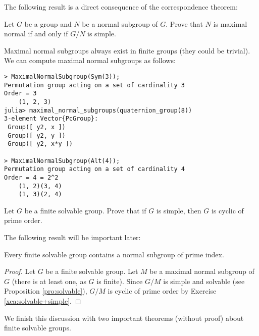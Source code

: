 The following result is a direct consequence of the correspondence theorem:

\begin{exercise}
\label{xca:G/N_simple}
    Let $G$ be a group and $N$ be a normal subgroup of $G$. Prove that 
    $N$ is maximal normal if and only if $G/N$ is simple. 
\end{exercise}

Maximal normal subgroups always exist in finite groups (they could be trivial). 
We can compute maximal normal subgroups as follows:
\begin{lstlisting}
> MaximalNormalSubgroup(Sym(3));
Permutation group acting on a set of cardinality 3
Order = 3
    (1, 2, 3)
julia> maximal_normal_subgroups(quaternion_group(8))
3-element Vector{PcGroup}:
 Group([ y2, x ])
 Group([ y2, y ])
 Group([ y2, x*y ])

> MaximalNormalSubgroup(Alt(4));
Permutation group acting on a set of cardinality 4
Order = 4 = 2^2
    (1, 2)(3, 4)
    (1, 3)(2, 4)
\end{lstlisting}


\begin{exercise}
\label{xca:solvable+simple}
    Let $G$ be a 
    finite solvable group. Prove that if $G$ is simple, then 
    $G$ is cyclic of prime order. 
\end{exercise}

The following result will be important later:

\begin{proposition}
\label{pro:prime_index}
    Every finite solvable group contains a normal subgroup of prime index. 
\end{proposition}

\begin{proof}
    Let $G$ be a finite solvable group. 
    Let $M$ be a maximal normal subgroup of $G$ (there is at least one, as $G$ is finite). 
    Since $G/M$ is simple and solvable (see Proposition \ref{pro:solvable}), 
    $G/M$ is cyclic of prime order by Exercise \ref{xca:solvable+simple}.  
\end{proof}

We finish this discussion with two important theorems (without proof) 
about finite solvable groups. 

